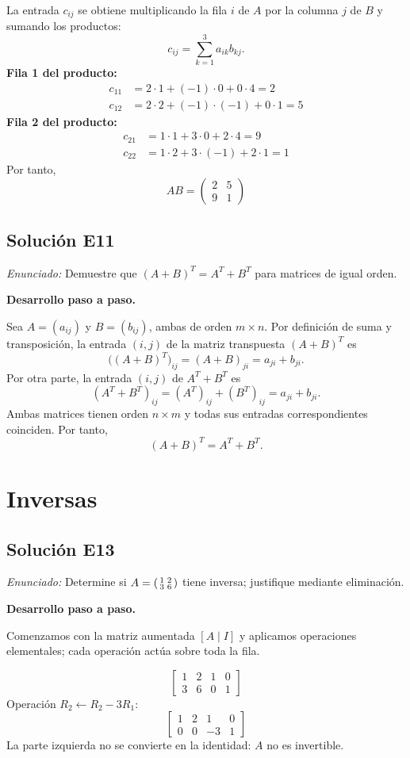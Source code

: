 \documentclass[12pt]{article}
\theoremstyle{remark}
\newcommand{\solucion}[2]{\Needspace{11\baselineskip}\subsection*{Solución E#1}\noindent\textit{Enunciado:} #2\par\medskip\noindent\textbf{Desarrollo paso a paso.}\par\medskip}
\begin{document}
La entrada $c_{ij}$ se obtiene multiplicando la fila $i$ de $A$ por la columna $j$ de $B$ y sumando los productos:
\[
c_{ij}=\sum_{k=1}^{3} a_{ik}b_{kj}.
\]
\textbf{Fila 1 del producto:}
\[
\begin{aligned}c_{11}&=2\cdot 1+(-1)\cdot 0+0\cdot 4=2\\c_{12}&=2\cdot 2+(-1)\cdot (-1)+0\cdot 1=5\end{aligned}
\]
\textbf{Fila 2 del producto:}
\[
\begin{aligned}c_{21}&=1\cdot 1+3\cdot 0+2\cdot 4=9\\c_{22}&=1\cdot 2+3\cdot (-1)+2\cdot 1=1\end{aligned}
\]
Por tanto,
\[
\boxed{AB=\begin{pmatrix}2&5\\9&1\end{pmatrix}}
\]

\medskip

\solucion{11}{Demuestre que $(A+B)^T=A^T+B^T$ para matrices de igual orden.}
Sea $A=(a_{ij})$ y $B=(b_{ij})$, ambas de orden $m\times n$. Por definición de suma y transposición, la entrada $(i,j)$ de la matriz transpuesta $(A+B)^T$ es
\[
\bigl((A+B)^T\bigr)_{ij}=(A+B)_{ji}=a_{ji}+b_{ji}.
\]
Por otra parte, la entrada $(i,j)$ de $A^T+B^T$ es
\[
(A^T+B^T)_{ij}=(A^T)_{ij}+(B^T)_{ij}=a_{ji}+b_{ji}.
\]
Ambas matrices tienen orden $n\times m$ y todas sus entradas correspondientes coinciden. Por tanto,
\[
\boxed{(A+B)^T=A^T+B^T}.
\]

\medskip

\section{Inversas}

\solucion{13}{Determine si $A=\begin{psmallmatrix}1&2\\3&6\end{psmallmatrix}$ tiene inversa; justifique mediante eliminación.}
Comenzamos con la matriz aumentada $[A\mid I]$ y aplicamos operaciones elementales; cada operación actúa sobre toda la fila.

\[
\left[\begin{array}{rr|rr}1&2&1&0\\3&6&0&1\end{array}\right]
\]
Operación $R_{2}\leftarrow R_{2}-3R_{1}$:
\[
\left[\begin{array}{rr|rr}1&2&1&0\\0&0&-3&1\end{array}\right]
\]
La parte izquierda no se convierte en la identidad: $A$ no es invertible.
\end{document}
